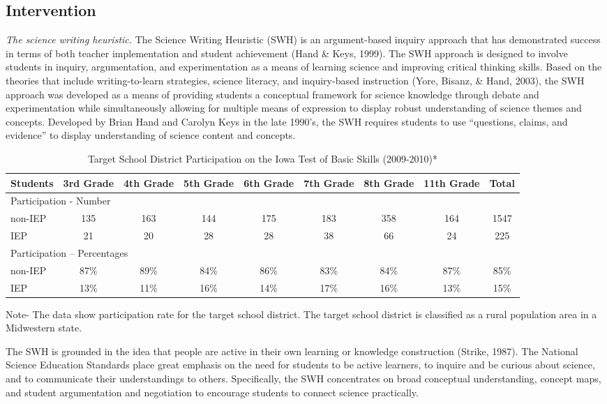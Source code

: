 \documentclass[11.5pt]{sig-alternate} %
\begin{document}
\begin{large}
\subsection*{Intervention}
\textit{The science writing heuristic.} The Science Writing Heuristic (SWH) is an argument-based inquiry approach that has demonstrated success in terms of both teacher implementation and student achievement (Hand \& Keys, 1999). The SWH approach is designed to involve students in inquiry, argumentation, and experimentation as a means of learning science and improving critical thinking skills. Based on the theories that include writing-to-learn strategies, science literacy, and inquiry-based instruction (Yore, Bisanz, \& Hand, 2003), the SWH approach was developed as a means of providing students a conceptual framework for science knowledge through debate and experimentation while simultaneously allowing for multiple means of expression to display robust understanding of science themes and concepts. Developed by Brian Hand and Carolyn Keys in the late 1990’s, the SWH requires students to use “questions, claims, and evidence” to display understanding of science content and concepts.

\begin{table}[th]
\caption{Target School District Participation on the Iowa Test of Basic Skills (2009-2010)*}
\begin{tabular}{lcccccccc}
\hline
Students & 3rd Grade & 4th Grade & 5th Grade & 6th Grade & 7th Grade & 8th Grade & 11th Grade & Total \\ \hline
\multicolumn{9}{l}{Participation - Number}\\ \hline
non-IEP & 135 & 163 & 144 & 175 & 183 & 358 & 164 & 1547 \\
IEP & 21 & 20 & 28 & 28 & 38 & 66 & 24 & 225 \\ \hline
\multicolumn{9}{l}{Participation – Percentages} \\ \hline
non-IEP & 87\% & 89\% & 84\% & 86\% & 83\% & 84\% & 87\% & 85\%  \\
IEP & 13\% & 11\% & 16\% & 14\% & 17\% & 16\% & 13\% & 15\%  \\ \hline
\end{tabular}
Note- The data show participation rate for the target school district. The target school district is classified as a rural population area in a Midwestern state.
\end{table}

The SWH is grounded in the idea that people are active in their own learning or knowledge construction (Strike, 1987). The National Science Education Standards place great emphasis on the need for students to be active learners, to inquire and be curious about science, and to communicate their understandings to others. Specifically, the SWH concentrates on broad conceptual understanding, concept maps, and student argumentation and negotiation to encourage students to connect science practically.


\end{large}
\end{document}
